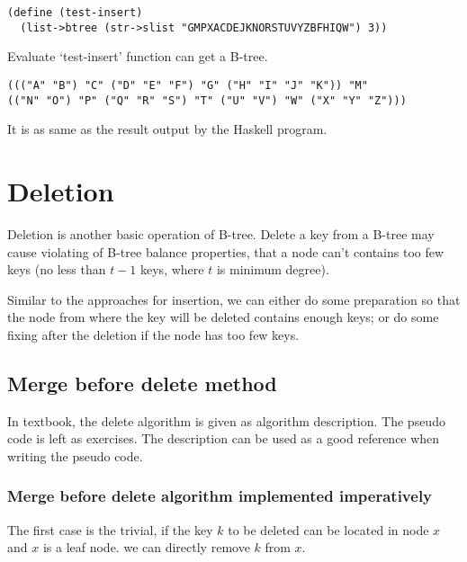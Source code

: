 \documentclass{article}
\begin{document}
\begin{lstlisting}
(define (test-insert)
  (list->btree (str->slist "GMPXACDEJKNORSTUVYZBFHIQW") 3))
\end{lstlisting}

Evaluate `test-insert' function can get a B-tree.

\begin{lstlisting}
((("A" "B") "C" ("D" "E" "F") "G" ("H" "I" "J" "K")) "M" 
(("N" "O") "P" ("Q" "R" "S") "T" ("U" "V") "W" ("X" "Y" "Z")))
\end{lstlisting}

It is as same as the result output by the Haskell program.

\section{Deletion} 

Deletion is another basic operation of B-tree. Delete a key from a
B-tree may cause violating of B-tree balance properties, that a node
can't contains too few keys (no less than $t-1$ keys, where $t$ is 
minimum degree).

Similar to the approaches for insertion, we can either do some preparation
so that the node from where the key will be deleted contains enough
keys; or do some fixing after the deletion if the node has too few keys.


\subsection{Merge before delete method} 

In textbook\cite{CLRS}, the delete algorithm is given as algorithm description.
The pseudo code is left as exercises. The description can be used
as a good reference when writing the pseudo code.

\subsubsection{Merge before delete algorithm implemented imperatively}

The first case is the trivial, if the key $k$ to be deleted
can be located in node $x$ and $x$ is a leaf node. we can directly
remove $k$ from $x$.
\end{document}
